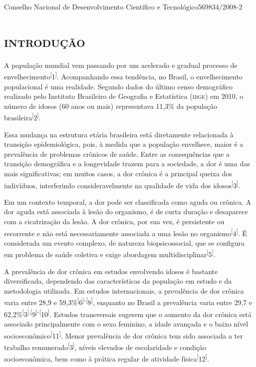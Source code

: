 \documentclass{article}
\begin{document}
\endgroup
Conselho Nacional de Desenvolvimento Científico e
Tecnológico569834/2008-2\section{\textsc{introdução}}

A população mundial vem passando por um acelerado e gradual processo de
envelhecimento\textsuperscript{[}1\textsuperscript{]}. Acompanhando essa tendência, no Brasil, o envelhecimento populacional é uma
realidade. Segundo dados do último censo demográfico realizado pelo Instituto
Brasileiro de Geografia e Estatística (\textsc{ibge}) em 2010, o número de idosos (60
anos ou mais) representava 11,3\% da população
brasileira\textsuperscript{[}2\textsuperscript{]}.

Essa mudança na estrutura etária brasileira está diretamente relacionada à
transição epidemiológica, pois, à medida que a população envelhece, maior é a
prevalência de problemas crônicos de saúde. Entre as consequências que a
transição demográfica e a longevidade trazem para a sociedade, a dor é uma das
mais significativas; em muitos casos, a dor crônica é a principal queixa dos
indivíduos, interferindo consideravelmente na qualidade de vida dos
idosos\textsuperscript{[}3\textsuperscript{]}.

Em um contexto temporal, a dor pode ser classificada como aguda ou crônica. A
dor aguda está associada à lesão do organismo, é de curta duração e desaparece
com a cicatrização da lesão. A dor crônica, por sua vez, é persistente ou
recorrente e não está necessariamente associada a uma lesão no
organismo\textsuperscript{[}4\textsuperscript{]}. É considerada um evento complexo, de natureza biopsicossocial, que se
configura em problema de saúde coletiva e exige abordagem
multidisciplinar\textsuperscript{[}5\textsuperscript{]}.

A prevalência de dor crônica em estudos envolvendo idosos é bastante
diversificada, dependendo das características da população em estudo e da
metodologia utilizada. Em estudos internacionais, a prevalência de dor crônica
varia entre 28,9 e 59,3\%\textsuperscript{[}6\textsuperscript{]}\textsuperscript{-}\textsuperscript{[}8\textsuperscript{]}, enquanto no Brasil a prevalência varia entre 29,7 e
62,2\%\textsuperscript{[}3\textsuperscript{]}\textsuperscript{,}\textsuperscript{[}9\textsuperscript{]}\textsuperscript{-}\textsuperscript{[}10\textsuperscript{]}. Estudos transversais sugerem que o aumento da dor crônica está associado
principalmente com o sexo feminino, a idade avançada e o baixo nível
socioeconômico\textsuperscript{[}11\textsuperscript{]}. Menor prevalência de dor crônica tem sido associada a ter trabalho
remunerado\textsuperscript{[}3\textsuperscript{]}, níveis elevados de escolaridade e condição socioeconômica, bem como à prática
regular de atividade física\textsuperscript{[}12\textsuperscript{]}.
\end{document}

